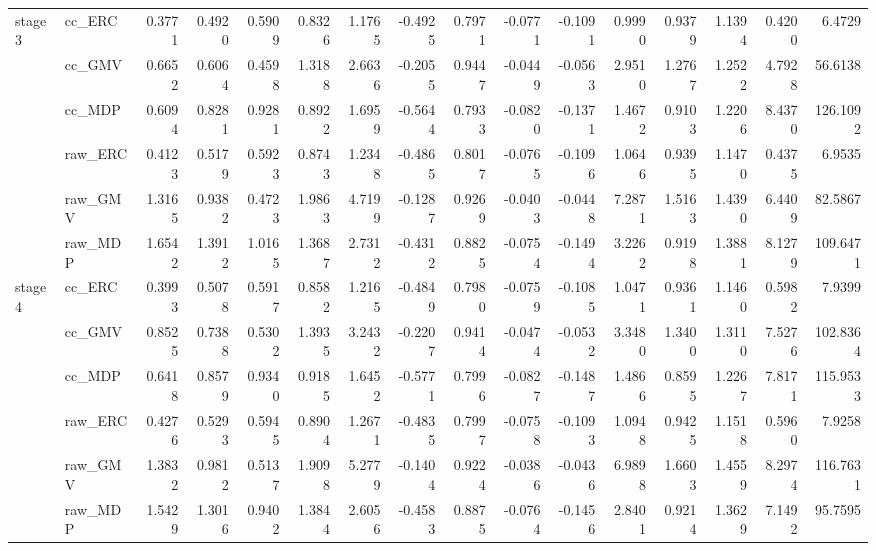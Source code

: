 \begin{tabular}{llrrrrrrrrrrrrrr}
\cline{1-16}
\multirow[t]{6}{*}{stage3} & cc_ERC & 0.3771 & 0.4920 & 0.5909 & 0.8326 & 1.1765 & -0.4925 & 0.7971 & -0.0771 & -0.1091 & 0.9990 & 0.9379 & 1.1394 & 0.4200 & 6.4729 \\
 & cc_GMV & 0.6652 & 0.6064 & 0.4598 & 1.3188 & 2.6636 & -0.2055 & 0.9447 & -0.0449 & -0.0563 & 2.9510 & 1.2767 & 1.2522 & 4.7928 & 56.6138 \\
 & cc_MDP & 0.6094 & 0.8281 & 0.9281 & 0.8922 & 1.6959 & -0.5644 & 0.7933 & -0.0820 & -0.1371 & 1.4672 & 0.9103 & 1.2206 & 8.4370 & 126.1092 \\
 & raw_ERC & 0.4123 & 0.5179 & 0.5923 & 0.8743 & 1.2348 & -0.4865 & 0.8017 & -0.0765 & -0.1096 & 1.0646 & 0.9395 & 1.1470 & 0.4375 & 6.9535 \\
 & raw_GMV & 1.3165 & 0.9382 & 0.4723 & 1.9863 & 4.7199 & -0.1287 & 0.9269 & -0.0403 & -0.0448 & 7.2871 & 1.5163 & 1.4390 & 6.4409 & 82.5867 \\
 & raw_MDP & 1.6542 & 1.3912 & 1.0165 & 1.3687 & 2.7312 & -0.4312 & 0.8825 & -0.0754 & -0.1494 & 3.2262 & 0.9198 & 1.3881 & 8.1279 & 109.6471 \\
\cline{1-16}
\multirow[t]{6}{*}{stage4} & cc_ERC & 0.3993 & 0.5078 & 0.5917 & 0.8582 & 1.2165 & -0.4849 & 0.7980 & -0.0759 & -0.1085 & 1.0471 & 0.9361 & 1.1460 & 0.5982 & 7.9399 \\
 & cc_GMV & 0.8525 & 0.7388 & 0.5302 & 1.3935 & 3.2432 & -0.2207 & 0.9414 & -0.0474 & -0.0532 & 3.3480 & 1.3400 & 1.3110 & 7.5276 & 102.8364 \\
 & cc_MDP & 0.6418 & 0.8579 & 0.9340 & 0.9185 & 1.6452 & -0.5771 & 0.7996 & -0.0827 & -0.1487 & 1.4866 & 0.8595 & 1.2267 & 7.8171 & 115.9533 \\
 & raw_ERC & 0.4276 & 0.5293 & 0.5945 & 0.8904 & 1.2671 & -0.4835 & 0.7997 & -0.0758 & -0.1093 & 1.0948 & 0.9425 & 1.1518 & 0.5960 & 7.9258 \\
 & raw_GMV & 1.3832 & 0.9812 & 0.5137 & 1.9098 & 5.2779 & -0.1404 & 0.9224 & -0.0386 & -0.0436 & 6.9898 & 1.6603 & 1.4559 & 8.2974 & 116.7631 \\
 & raw_MDP & 1.5429 & 1.3016 & 0.9402 & 1.3844 & 2.6056 & -0.4583 & 0.8875 & -0.0764 & -0.1456 & 2.8401 & 0.9214 & 1.3629 & 7.1492 & 95.7595 \\
\cline{1-16}
\bottomrule
\end{tabular}
